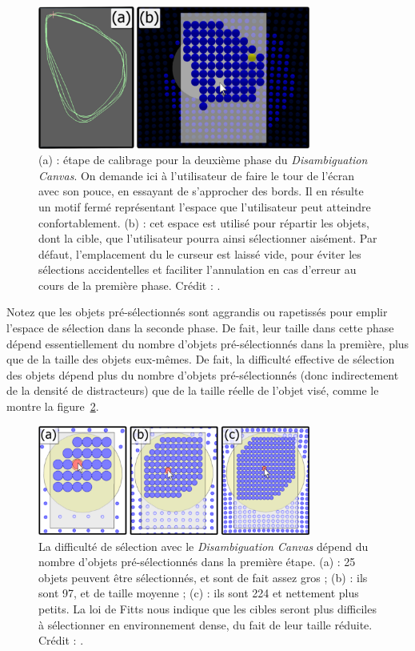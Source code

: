 	\begin{figure}[!htb]
		\centering
		\includegraphics[width=0.8\textwidth]{figures/ch2/dCanvasLayout}
		\caption[\emph{Disambiguation Canvas} -- calibrage]{(a) : étape de calibrage pour la deuxième phase du \emph{Disambiguation Canvas}. On demande ici à l'utilisateur de faire le tour de l'écran avec son pouce, en essayant de s'approcher des bords. Il en résulte un motif fermé représentant l'espace que l'utilisateur peut atteindre confortablement. (b) : cet espace est utilisé pour répartir les objets, dont la cible, que l'utilisateur pourra ainsi sélectionner aisément. Par défaut, l'emplacement du le curseur est laissé vide, pour éviter les sélections accidentelles et faciliter l'annulation en cas d'erreur au cours de la première phase. Crédit : \cite{debarba2013disambiguation}.}
		\label{fig:dCanvasLayout}
	\end{figure}
	
	Notez que les objets pré-sélectionnés sont aggrandis ou rapetissés pour emplir l'espace de sélection dans la seconde phase. De fait, leur taille dans cette phase dépend essentiellement du nombre d'objets pré-sélectionnés dans la première, plus que de la taille des objets eux-mêmes. De fait, la difficulté effective de sélection des objets dépend plus du nombre d'objets pré-sélectionnés (donc indirectement de la densité de distracteurs) que de la taille réelle de l'objet visé, comme le montre la figure~\ref{fig:dCanvasDensity}.
	
	\begin{figure}[!htb]
		\centering
		\includegraphics[width=0.80\textwidth]{figures/ch2/dCanvasDensity}
		\caption[\emph{Disambiguation Canvas} -- densité]{La difficulté de sélection avec le \emph{Disambiguation Canvas} dépend du nombre d'objets pré-sélectionnés dans la première étape. (a) : 25 objets peuvent être sélectionnés, et sont de fait assez gros ; (b) : ils sont 97, et de taille moyenne ; (c) : ils sont 224 et nettement plus petits. La loi de Fitts nous indique que les cibles seront plus difficiles à sélectionner en environnement dense, du fait de leur taille réduite. Crédit : \cite{debarba2013disambiguation}.}
		\label{fig:dCanvasDensity}
	\end{figure}
	
